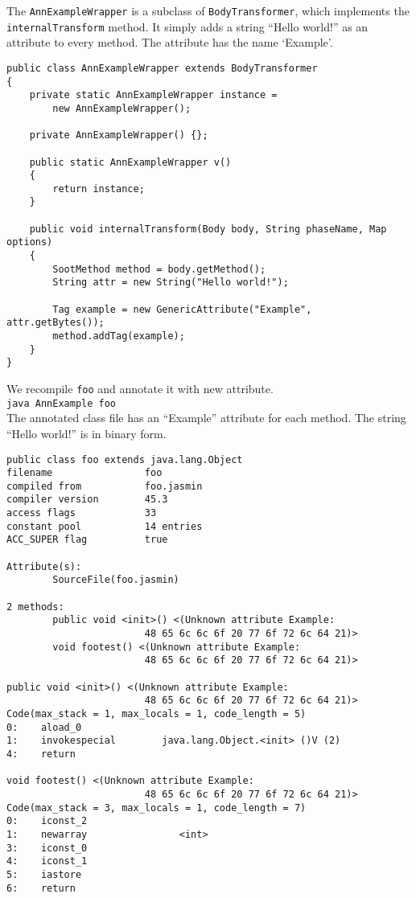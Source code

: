 \documentclass{article}
\begin{document}
The {\tt AnnExampleWrapper} is a subclass of {\tt BodyTransformer},
which implements the {\tt internalTransform} method. It simply
adds a string ``Hello world!'' as an attribute to every method.
The attribute has the name `Example'.

\begin{verbatim}
public class AnnExampleWrapper extends BodyTransformer
{
    private static AnnExampleWrapper instance =
        new AnnExampleWrapper();

    private AnnExampleWrapper() {};

    public static AnnExampleWrapper v()
    {
        return instance;
    }

    public void internalTransform(Body body, String phaseName, Map options)
    {
        SootMethod method = body.getMethod();
        String attr = new String("Hello world!");
        
        Tag example = new GenericAttribute("Example", attr.getBytes());
        method.addTag(example);
    }
}
\end{verbatim}

We recompile {\tt foo} and annotate it with new attribute.\\
{\tt java AnnExample foo}\\ 
The annotated class file has an ``Example'' attribute for each method.
The string ``Hello world!'' is in binary form.

\begin{verbatim}
public class foo extends java.lang.Object
filename                foo
compiled from           foo.jasmin
compiler version        45.3
access flags            33
constant pool           14 entries
ACC_SUPER flag          true

Attribute(s):
        SourceFile(foo.jasmin)

2 methods:
        public void <init>() <(Unknown attribute Example: 
                        48 65 6c 6c 6f 20 77 6f 72 6c 64 21)>
        void footest() <(Unknown attribute Example: 
                        48 65 6c 6c 6f 20 77 6f 72 6c 64 21)>

public void <init>() <(Unknown attribute Example: 
                        48 65 6c 6c 6f 20 77 6f 72 6c 64 21)>
Code(max_stack = 1, max_locals = 1, code_length = 5)
0:    aload_0
1:    invokespecial        java.lang.Object.<init> ()V (2)
4:    return

void footest() <(Unknown attribute Example: 
                        48 65 6c 6c 6f 20 77 6f 72 6c 64 21)>
Code(max_stack = 3, max_locals = 1, code_length = 7)
0:    iconst_2
1:    newarray                <int>
3:    iconst_0
4:    iconst_1
5:    iastore
6:    return
\end{verbatim}
\end{document}
